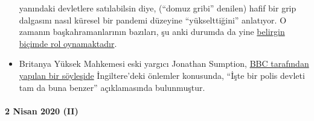 \begin{itemize}
  yanındaki devletlere satılabilsin diye, (``domuz gribi'' denilen)
  hafif bir grip dalgasını nasıl küresel bir pandemi düzeyine
  ``yükselttiğini'' anlatıyor. O zamanın başkahramanlarının bazıları, şu
  anki durumda da yine
  \href{https://www.nature.com/articles/news.2009.424}{belirgin biçimde
  rol oynamaktadır}.
\item
  Britanya Yüksek Mahkemesi eski yargıcı Jonathan Sumption,
  \href{https://www.spectator.co.uk/article/former-supreme-court-justice-this-is-what-a-police-state-is-like-}{BBC
  ta}\href{https://www.spectator.co.uk/article/former-supreme-court-justice-this-is-what-a-police-state-is-like-}{rafından
  yapılan bir söyleşide} İngiltere'deki önlemler konusunda, ``İşte bir
  polis devleti tam da buna benzer'' açıklamasında bulunmuştur.
\end{itemize}

\hypertarget{-2-nisan-2020-ii}{%
\paragraph{ 2 Nisan 2020 (II)}\label{-2-nisan-2020-ii}}

